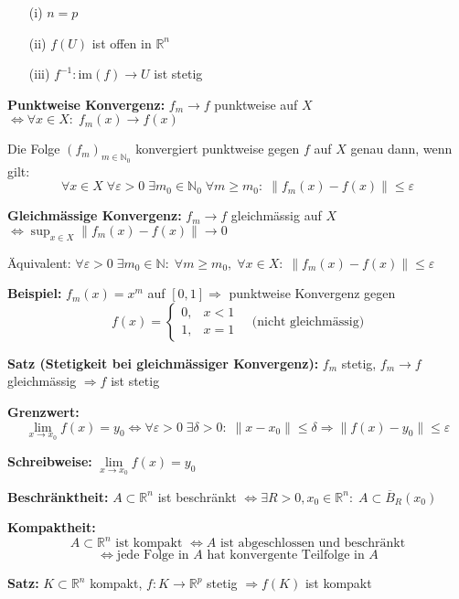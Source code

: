 \begin{itemize}
  \item[(i)] \(n = p\)
  \item[(ii)] \(f(U)\) ist offen in \(\mathbb{R}^n\)
  \item[(iii)] \(f^{-1}: \text{im}(f) \to U\) ist stetig
\end{itemize}


\textbf{Punktweise Konvergenz:}  
\(f_m \to f\) punktweise auf \(X\)  
\(\Leftrightarrow \forall x \in X:\; f_m(x) \to f(x)\)

Die Folge $(f_m)_{m \in \mathbb{N}_0}$ konvergiert punktweise gegen $f$ auf $X$ genau dann, wenn gilt:
\[
\forall x \in X\; \forall \varepsilon > 0\; \exists m_0 \in \mathbb{N}_0\; \forall m \ge m_0:\; \|f_m(x) - f(x)\| \le \varepsilon
\]

\textbf{Gleichmässige Konvergenz:}  
\(f_m \to f\) gleichmässig auf \(X\)  
\(\Leftrightarrow \sup_{x \in X} \|f_m(x) - f(x)\| \to 0\)

Äquivalent:  
\(\forall \varepsilon > 0\; \exists m_0 \in \mathbb{N}:\; \forall m \ge m_0,\; \forall x \in X:\; \|f_m(x) - f(x)\| \le \varepsilon\)

\textbf{Beispiel:} \(f_m(x) = x^m\) auf \([0,1] \Rightarrow\) punktweise Konvergenz gegen  
\[
f(x) = \begin{cases}
0, & x < 1 \\
1, & x = 1
\end{cases}
\quad \text{(nicht gleichmässig)}
\]

\textbf{Satz (Stetigkeit bei gleichmässiger Konvergenz):}  
\(f_m\) stetig,\; \(f_m \to f\) gleichmässig \(\Rightarrow f\) ist stetig


\textbf{Grenzwert:}  
\[
\lim_{x \to x_0} f(x) = y_0 \Leftrightarrow
\forall \varepsilon > 0\; \exists \delta > 0:\;
\|x - x_0\| \leq \delta \Rightarrow \|f(x) - y_0\| \leq \varepsilon
\]

\textbf{Schreibweise:}  
\( \lim\limits_{x \to x_0} f(x) = y_0 \)

\textbf{Beschränktheit:}  
\(A \subset \mathbb{R}^n\) ist beschränkt \(\Leftrightarrow \exists R > 0, x_0 \in \mathbb{R}^n:\; A \subset \overline{B}_R(x_0)\)

\textbf{Kompaktheit:}  
\[
A \subset \mathbb{R}^n \text{ ist kompakt } \Leftrightarrow A \text{ ist abgeschlossen und beschränkt}
\]
\[
\Leftrightarrow \text{jede Folge in } A \text{ hat konvergente Teilfolge in } A
\]

\textbf{Satz:}  
\(K \subset \mathbb{R}^n\) kompakt,\; \(f: K \to \mathbb{R}^p\) stetig  
\(\Rightarrow f(K)\) ist kompakt

